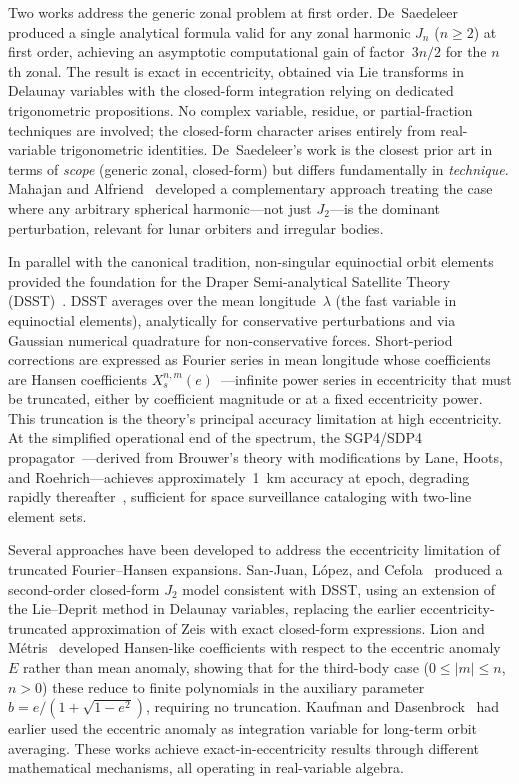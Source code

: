 Two works address the generic zonal problem at first order.
De~Saedeleer~\cite{desaedeleer2005} produced a single analytical formula
valid for any zonal harmonic $J_n$ ($n \geq 2$) at first order, achieving
an asymptotic computational gain of factor~$3n/2$ for the $n$th zonal.
The result is exact in eccentricity, obtained via Lie transforms in Delaunay
variables with the closed-form integration relying on dedicated
trigonometric propositions.
No complex variable, residue, or partial-fraction techniques are involved;
the closed-form character arises entirely from real-variable trigonometric
identities.  De~Saedeleer's work is the closest prior art in terms of
\emph{scope} (generic zonal, closed-form) but differs fundamentally in
\emph{technique}.  Mahajan and Alfriend~\cite{mahajan2019} developed a
complementary approach treating the case where any arbitrary spherical
harmonic---not just $J_2$---is the dominant perturbation, relevant for
lunar orbiters and irregular bodies.

In parallel with the canonical tradition, non-singular equinoctial orbit
elements~\cite{broucke1972,walker1985} provided the foundation for the
Draper Semi-analytical Satellite Theory
(DSST)~\cite{cefola1972,danielson1995}.  DSST averages over the mean
longitude~$\lambda$ (the fast variable in equinoctial elements),
analytically for conservative perturbations and via Gaussian numerical
quadrature for non-conservative forces.  Short-period corrections are expressed as Fourier series in mean
longitude whose coefficients are Hansen coefficients
$X_s^{n,m}(e)$~\cite{giacaglia1976}---infinite power series in
eccentricity that must be truncated, either by coefficient magnitude or
at a fixed eccentricity power.  This truncation is the theory's principal
accuracy limitation at high eccentricity.  At the simplified operational end of the spectrum, the SGP4/SDP4
propagator~\cite{spacetrack1980,vallado2006}---derived from Brouwer's theory
with modifications by Lane, Hoots, and Roehrich---achieves
approximately~1~km accuracy at epoch, degrading rapidly
thereafter~\cite{vallado2006}, sufficient for
space surveillance cataloging with two-line element sets.

Several approaches have been developed to address the eccentricity
limitation of truncated Fourier--Hansen expansions.  San-Juan, L\'opez, and
Cefola~\cite{sanjuan2022} produced a second-order closed-form $J_2$
model consistent with DSST, using an extension of the Lie--Deprit method in
Delaunay variables, replacing the earlier eccentricity-truncated
approximation of Zeis with exact closed-form expressions.  Lion and
M\'etris~\cite{lion2013} developed Hansen-like coefficients with respect to
the eccentric anomaly~$E$ rather than mean anomaly, showing that for the
third-body case ($0 \leq |m| \leq n$, $n > 0$) these reduce to finite
polynomials in the auxiliary parameter $b = e/(1+\sqrt{1-e^2})$, requiring
no truncation.
Kaufman and Dasenbrock~\cite{kaufman1973} had earlier used the eccentric
anomaly as integration variable for long-term orbit averaging.  These works
achieve exact-in-eccentricity results through different mathematical
mechanisms, all operating in real-variable algebra.

